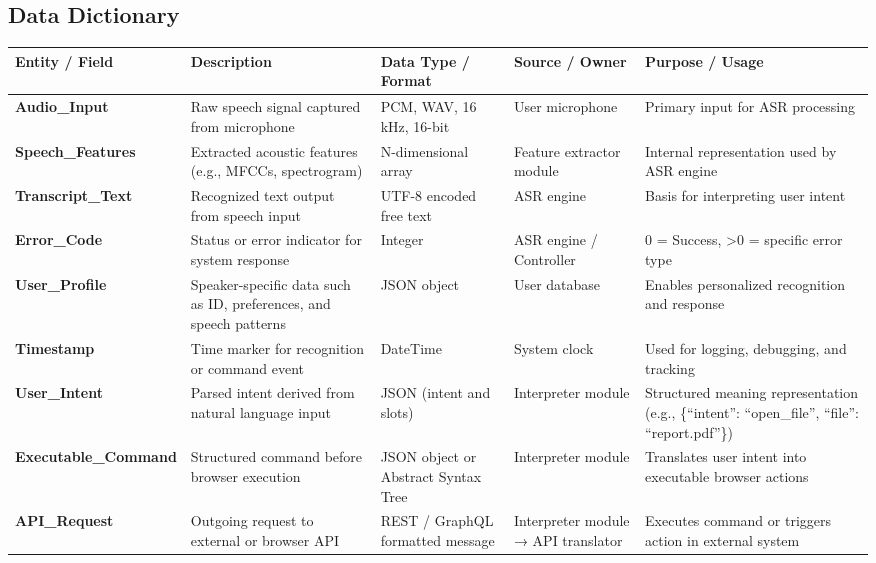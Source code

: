 \documentclass[11pt]{article}
\begin{document}
\subsection{Data Dictionary}

\begin{tabularx}{\textwidth}{p{3cm} X p{2.8cm} p{2.8cm} X}
\toprule
\textbf{Entity / Field} & \textbf{Description} & \textbf{Data Type / Format} & \textbf{Source / Owner} & \textbf{Purpose / Usage} \\
\midrule

\textbf{Audio\_Input} & Raw speech signal captured from microphone & PCM, WAV, 16 kHz, 16-bit & User microphone & Primary input for ASR processing \\

\textbf{Speech\_Features} & Extracted acoustic features (e.g., MFCCs, spectrogram) & N-dimensional array & Feature extractor module & Internal representation used by ASR engine \\

\textbf{Transcript\_Text} & Recognized text output from speech input & UTF-8 encoded free text & ASR engine & Basis for interpreting user intent \\

\textbf{Error\_Code} & Status or error indicator for system response & Integer & ASR engine / Controller & 0 = Success, >0 = specific error type \\

\textbf{User\_Profile} & Speaker-specific data such as ID, preferences, and speech patterns & JSON object & User database & Enables personalized recognition and response \\

\textbf{Timestamp} & Time marker for recognition or command event & DateTime & System clock & Used for logging, debugging, and tracking \\

\textbf{User\_Intent} & Parsed intent derived from natural language input & JSON (intent and slots) & Interpreter module & Structured meaning representation (e.g., \{“intent”: “open\_file”, “file”: “report.pdf”\}) \\

\textbf{Executable\_Command} & Structured command before browser execution & JSON object or Abstract Syntax Tree & Interpreter module & Translates user intent into executable browser actions \\

\textbf{API\_Request} & Outgoing request to external or browser API & REST / GraphQL formatted message & Interpreter module → API translator & Executes command or triggers action in external system \\


\end{tabularx}
\end{document}
